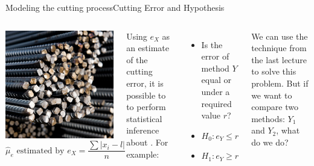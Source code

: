 \begin{frame}[t]{Modeling the cutting process}{Cutting Error and Hypothesis}
  \begin{columns}[T]
    \includegraphics[width=\textwidth]{../img/steelrods}
    \begin{equation*}
      \hat\mu_e \text{ estimated by } e_X = \frac{\sum{|x_i - l|}}{n}
    \end{equation*}

    Using $e_X$ as an estimate of the cutting error, it is possible to to perform statistical inference about . For example:\bigskip

    \begin{itemize}
      \item Is the error of method $Y$ equal or under a required value $r$?
      \item $H_0: e_Y \leq r$
      \item $H_1: e_Y \geq r$
    \end{itemize}\bigskip

    We can use the technique from the last lecture to solve this problem. But if we want to compare two methods: $Y_1$ and $Y_2$, what do we do?
  \end{columns}
\end{frame}

